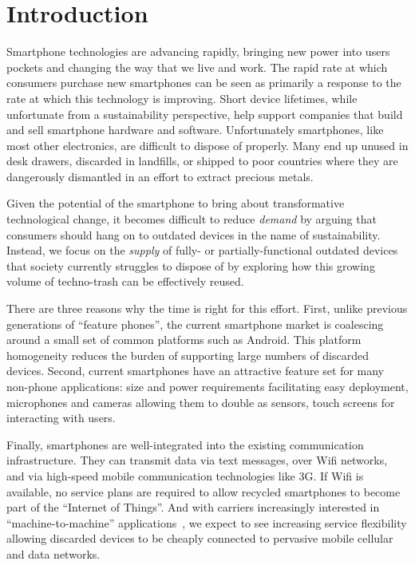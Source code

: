 \section{Introduction}

Smartphone technologies are advancing rapidly, bringing new power into users
pockets and changing the way that we live and work. The rapid rate at which
consumers purchase new smartphones can be seen as primarily a response to the
rate at which this technology is improving. Short device lifetimes, while
unfortunate from a sustainability perspective, help support companies that
build and sell smartphone hardware and software. Unfortunately smartphones,
like most other electronics, are difficult to dispose of properly. Many end
up unused in desk drawers, discarded in landfills, or shipped to poor
countries where they are dangerously dismantled in an effort to extract
precious metals.

Given the potential of the smartphone to bring about transformative
technological change, it becomes difficult to reduce \textit{demand} by
arguing that consumers should hang on to outdated devices in the name of
sustainability. Instead, we focus on the \textit{supply} of fully- or
partially-functional outdated devices that society currently struggles to
dispose of by exploring how this growing volume of techno-trash can be
effectively reused.

There are three reasons why the time is right for this effort. First, unlike
previous generations of ``feature phones'', the current smartphone market is
coalescing around a small set of common platforms such as Android. This
platform homogeneity reduces the burden of supporting large numbers of
discarded devices. Second, current smartphones have an attractive feature set
for many non-phone applications: size and power requirements facilitating
easy deployment, microphones and cameras allowing them to double as sensors,
touch screens for interacting with users.

Finally, smartphones are well-integrated into the existing communication
infrastructure. They can transmit data via text messages, over Wifi networks,
and via high-speed mobile communication technologies like 3G. If Wifi is
available, no service plans are required to allow recycled smartphones to
become part of the ``Internet of Things''. And with carriers increasingly
interested in ``machine-to-machine'' applications~\cite{FIXME-m2m}, we expect
to see increasing service flexibility allowing discarded devices to be
cheaply connected to pervasive mobile cellular and data networks.

